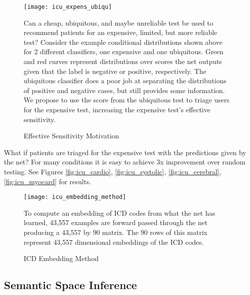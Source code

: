 \begin{figure}
\begin{center}
\texttt{[image: icu\_expens\_ubiqu]}
\end{center}
\caption{Effective Sensitivity Motivation}
\vspace{12px}
Can a cheap, ubiquitous, and maybe unreliable test be used to recommend patients for an expensive, limited, but more reliable test?  Consider the example conditional distributions shown above for 2 different classifiers, one expensive and one ubiquitous.  Green and red curves represent distributions over scores the net outputs given that the label is negative or positive, respectively.  The ubiquitous classifier does a poor job at separating the distributions of positive and negative cases, but still provides some information.  We propose to use the score from the ubiquitous test to triage users for the expensive test, increasing the expensive test's effective sensitivity.
\label{fig:icu_expens_ubiqu}
\end{figure}

What if patients are triaged for the expensive test with the predictions given by the net?  For many conditions it is easy to achieve 3x improvement over random testing.  See Figures \ref{fig:icu_cardio}, \ref{fig:icu_systolic}, \ref{fig:icu_cerebral}, \ref{fig:icu_myocard} for results.

\pagebreak
\begin{figure}[h]
\begin{center}
\texttt{[image: icu\_embedding\_method]}
\end{center}
\caption{ICD Embedding Method}
\vspace{12px}
To compute an embedding of ICD codes from what the net has learned, 43,557 examples are forward passed through the net producing a 43,557 by 90 matrix.  The 90 rows of this matrix represent 43,557 dimensional embeddings of the ICD codes.
\label{fig:icu_embedding_method}
\end{figure}

\subsection{Semantic Space Inference}

